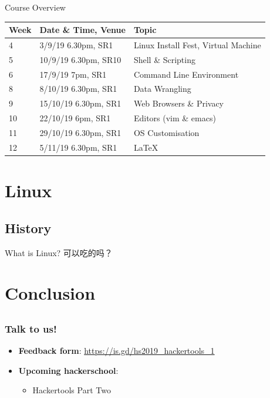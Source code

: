 \documentclass[12pt]{beamer}
\begin{document}
\begin{frame}{Course Overview}
  \begin{center}
    \begin{tabularx}{\textwidth}{l|l|X}
      Week & Date \& Time, Venue  & Topic                               \\ \hline
      4    & 3/9/19 6.30pm, SR1   & Linux Install Fest, Virtual Machine \\ \hline
      5    & 10/9/19 6.30pm, SR10 & Shell \& Scripting                  \\ \hline
      6    & 17/9/19 7pm, SR1     & Command Line Environment            \\ \hline
      8    & 8/10/19 6.30pm, SR1  & Data Wrangling                      \\ \hline
      9    & 15/10/19 6.30pm, SR1 & Web Browsers \& Privacy             \\ \hline
      10   & 22/10/19 6pm, SR1    & Editors (vim \& emacs)              \\ \hline
      11   & 29/10/19 6.30pm, SR1 & OS Customisation                    \\ \hline
      12   & 5/11/19 6.30pm, SR1  & \LaTeX                              \\ \hline
    \end{tabularx}
  \end{center}
\end{frame}

\section{Linux}
\subsection{History}
\begin{frame}{What is Linux?}
  可以吃的吗？
\end{frame}

\section{Conclusion}
\subsection{}
\begin{frame}
  \frametitle{Talk to us!}
  \begin{itemize}
    \item \textbf{Feedback form}: \url{https://is.gd/hs2019_hackertools_1}
    \item \textbf{Upcoming hackerschool}:
          \begin{itemize}
            \item Hackertools Part Two
          \end{itemize}
  \end{itemize}
\end{frame}
\end{document}
